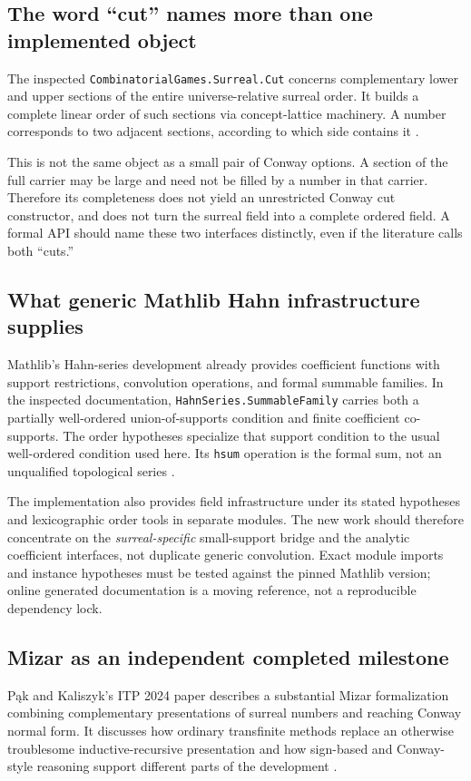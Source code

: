 \documentclass[11pt,letterpaper]{article}
\numberwithin{equation}{section}
\theoremstyle{definition}
\theoremstyle{remark}
\begin{document}
\subsection{The word ``cut'' names more than one implemented object}
The inspected \texttt{CombinatorialGames.Surreal.Cut} concerns complementary lower and upper sections of the entire universe-relative surreal order. It builds a complete linear order of such sections via concept-lattice machinery. A number corresponds to two adjacent sections, according to which side contains it \cite{GamesCuts}.

This is not the same object as a small pair of Conway options. A section of the full carrier may be large and need not be filled by a number in that carrier. Therefore its completeness does not yield an unrestricted Conway cut constructor, and does not turn the surreal field into a complete ordered field. A formal API should name these two interfaces distinctly, even if the literature calls both ``cuts.''

\subsection{What generic Mathlib Hahn infrastructure supplies}
Mathlib's Hahn-series development already provides coefficient functions with support restrictions, convolution operations, and formal summable families. In the inspected documentation, \texttt{HahnSeries.SummableFamily} carries both a partially well-ordered union-of-supports condition and finite coefficient co-supports. The order hypotheses specialize that support condition to the usual well-ordered condition used here. Its \texttt{hsum} operation is the formal sum, not an unqualified topological series \cite{HahnBasic,HahnSummable}.

The implementation also provides field infrastructure under its stated hypotheses and lexicographic order tools in separate modules. The new work should therefore concentrate on the \emph{surreal-specific} small-support bridge and the analytic coefficient interfaces, not duplicate generic convolution. Exact module imports and instance hypotheses must be tested against the pinned Mathlib version; online generated documentation is a moving reference, not a reproducible dependency lock.

\subsection{Mizar as an independent completed milestone}
P\k ak and Kaliszyk's ITP 2024 paper describes a substantial Mizar formalization combining complementary presentations of surreal numbers and reaching Conway normal form. It discusses how ordinary transfinite methods replace an otherwise troublesome inductive-recursive presentation and how sign-based and Conway-style reasoning support different parts of the development \cite{PakKaliszyk}.
\end{document}

